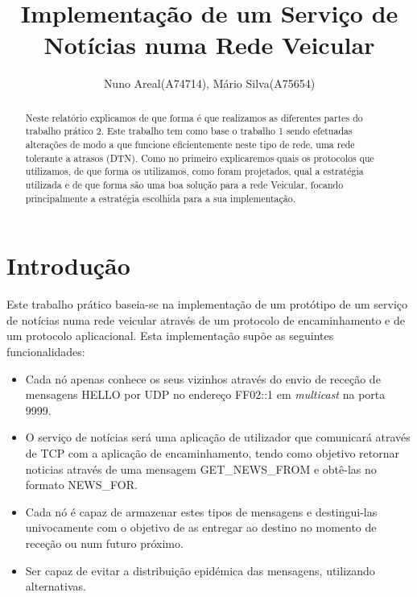 \documentclass{llncs}
\begin{document}
%
\frontmatter          %
%
\pagestyle{headings}  %
%

%
\title{Implementação de um Serviço de Notícias numa Rede Veicular}
%
%
\author{Nuno Areal(A74714), Mário Silva(A75654)}
%
%
%

\maketitle              %

\begin{abstract}
Neste relatório explicamos de que forma é que realizamos as diferentes partes do trabalho prático 2. Este trabalho tem como base o trabalho 1 sendo efetuadas alterações de modo a que funcione eficientemente neste tipo de rede, uma rede tolerante a atrasos (DTN). Como no primeiro explicaremos quais os protocolos que utilizamos, de que forma os utilizamos, como foram projetados, qual a estratégia utilizada e de que forma são uma boa solução para a rede Veicular, focando principalmente a estratégia escolhida para a sua implementação.
\end{abstract}


\section{Introdução}

Este trabalho prático baseia-se na implementação de um protótipo de um serviço de notícias numa rede veicular através de um protocolo de encaminhamento e de um protocolo aplicacional. Esta implementação supõe as seguintes funcionalidades:

\begin{itemize}
    \item Cada nó apenas conhece os seus vizinhos através do envio de receção de mensagens HELLO por UDP no endereço FF02::1 em \emph{multicast} na porta 9999.
    \item O serviço de notícias será uma aplicação de utilizador que comunicará através de TCP com a aplicação de encaminhamento, tendo como objetivo retornar noticias através de uma mensagem GET\_NEWS\_FROM e obtê-las no formato NEWS\_FOR.
    \item Cada nó é capaz de armazenar estes tipos de mensagens e destingui-las univocamente com o objetivo de as entregar ao destino no momento de receção ou num futuro próximo.
    \item Ser capaz de evitar a distribuição epidémica das mensagens, utilizando alternativas.
\end{itemize}
\end{document}
